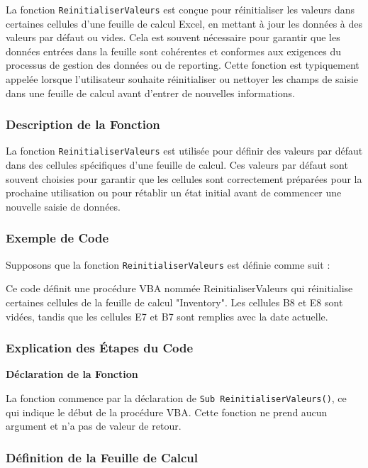 \documentclass[a4paper, oneside, 12pt, final]{extreport}
\begin{document}
La fonction \texttt{ReinitialiserValeurs} est conçue pour réinitialiser les valeurs dans certaines cellules d'une feuille de calcul Excel, en mettant à jour les données à des valeurs par défaut ou vides. Cela est souvent nécessaire pour garantir que les données entrées dans la feuille sont cohérentes et conformes aux exigences du processus de gestion des données ou de reporting. Cette fonction est typiquement appelée lorsque l'utilisateur souhaite réinitialiser ou nettoyer les champs de saisie dans une feuille de calcul avant d'entrer de nouvelles informations.

\subsubsection{Description de la Fonction}

La fonction \texttt{ReinitialiserValeurs} est utilisée pour définir des valeurs par défaut dans des cellules spécifiques d'une feuille de calcul. Ces valeurs par défaut sont souvent choisies pour garantir que les cellules sont correctement préparées pour la prochaine utilisation ou pour rétablir un état initial avant de commencer une nouvelle saisie de données.

\subsubsection{Exemple de Code}

Supposons que la fonction \texttt{ReinitialiserValeurs} est définie comme suit :

Ce code définit une procédure VBA nommée ReinitialiserValeurs qui réinitialise certaines cellules de la feuille de calcul "Inventory". Les cellules B8 et E8 sont vidées, tandis que les cellules E7 et B7 sont remplies avec la date actuelle.
\subsubsection{Explication des Étapes du Code}

\textbf{Déclaration de la Fonction}

La fonction commence par la déclaration de \texttt{Sub ReinitialiserValeurs()}, ce qui indique le début de la procédure VBA. Cette fonction ne prend aucun argument et n'a pas de valeur de retour.

\subsubsection{Définition de la Feuille de Calcul}
\end{document}
